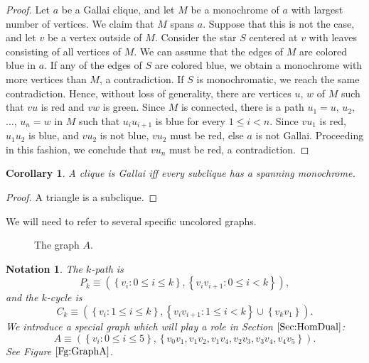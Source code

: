 \documentclass[12pt]{amsart}
\theoremstyle{plain}
\newtheorem{corollary}[theorem]{Corollary}
\newtheorem{notation}[theorem]{Notation}
\numberwithin{equation}{section}
\begin{document}
\begin{proof}
Let $a$ be a Gallai clique, and let $M$ be a monochrome of $a$ with largest
number of vertices. We claim that $M$ spans $a$. Suppose that this is not the
case, and let $v$ be a vertex outside of $M$. Consider the star $S$ centered at
$v$ with leaves consisting of all vertices of $M$. We can assume that the edges
of $M$ are colored blue in $a$. If any of the edges of $S$ are colored blue, we
obtain a monochrome with more vertices than $M$, a contradiction. If $S$ is
monochromatic, we reach the same contradiction. Hence, without loss of
generality, there are vertices $u$, $w$ of $M$ such that $vu$ is red and $vw$
is green. Since $M$ is connected, there is a path $u_1=u$, $u_2$, $\dots$,
$u_n=w$ in $M$ such that $u_iu_{i+1}$ is blue for every $1\le i<n$. Since
$vu_1$ is red, $u_1u_2$ is blue, and $vu_2$ is not blue, $vu_2$ must be red,
else $a$ is not Gallai. Proceeding in this fashion, we conclude that $vu_n$
must be red, a contradiction.
\end{proof}

\begin{corollary}
A clique is Gallai iff every subclique has a spanning monochrome.
\end{corollary}

\begin{proof}
A triangle is a subclique.
\end{proof}

We will need to refer to several specific uncolored graphs.

\setlength{\unitlength}{0.7mm}
\begin{figure}[th]
\begin{center}



\end{center}
\caption{The graph $A$.} \label{Fg:GraphA}
\end{figure}

\begin{notation}
\label{Note:SpGr}The $k$\emph{-path} is
\begin{displaymath}
    P_{k}\equiv\left(  \left\{  v_{i}:0\leq i\leq k\right\}  ,\left\{
    v_{i}v_{i+1}:0\leq i<k\right\}  \right)  ,
\end{displaymath}
and the $k$\emph{-cycle} is
\begin{displaymath}
    C_{k}\equiv\left(  \left\{  v_{i}:1\leq i\leq k\right\}  ,\left\{
    v_{i}v_{i+1}:1\leq i<k\right\}  \cup\left\{  v_{k}v_{1}\right\}  \right)  .
\end{displaymath}
We introduce a special graph which will play a role in Section
$\ref{Sec:HomDual}$:
\begin{displaymath}
    A\equiv\left(  \left\{  v_{i}:0\leq i\leq5\right\}  ,\left\{
    v_{0}v_{1},v_{1}v_{2},v_{1}v_{4},v_{2}v_{3},v_{3}v_{4},v_{4}v_{5}\right\}
    \right)  .
\end{displaymath}
See Figure $\ref{Fg:GraphA}$.
\end{notation}
\end{document}
